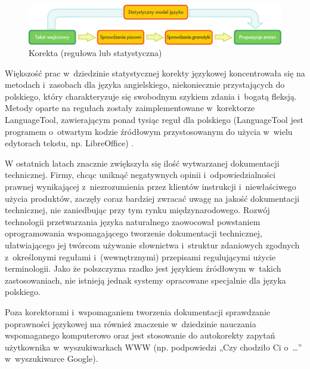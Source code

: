 \begin{multicols}{2}
\begin{figure}[t]  \center
\includegraphics[width=\textwidth]{../_media/polish/language_checking}
\caption{Korekta (regułowa lub statystyczna)} \label{fig:
langcheckingaarch_pl} 
\end{figure} 

Większość prac w~dziedzinie statystycznej korekty językowej
koncentrowała się na metodach i~zasobach dla języka angielskiego,
niekoniecznie przystających do polskiego, który charakteryzuje się
swobodnym szykiem zdania i~bogatą fleksją. Metody oparte na
regułach zostały zaimplementowane w~korektorze LanguageTool,
zawierającym ponad tysiąc reguł dla polskiego (LanguageTool jest
programem o~otwartym kodzie źródłowym przystosowanym do użycia
w~wielu edytorach tekstu, np. LibreOffice) \cite{lto1, Mikowski2010}. 


W ostatnich latach znacznie zwiększyła się ilość wytwarzanej
dokumentacji technicznej. Firmy, chcąc uniknąć negatywnych opinii
i~odpowiedzialności prawnej wynikającej z~niezrozumienia przez
klientów instrukcji i~niewłaściwego użycia produktów, zaczęły
coraz bardziej zwracać uwagę na jakość dokumentacji technicznej,
nie zaniedbując przy tym rynku międzynarodowego. Rozwój technologii
przetwarzania języka naturalnego zaowocował powstaniem
oprogramowania wspomagającego tworzenie dokumentacji technicznej,
ułatwiającego jej twórcom używanie słownictwa i~struktur
zdaniowych zgodnych z~określonymi regułami i~(wewnętrznymi)
przepisami regulującymi użycie terminologii. Jako że polszczyzna
rzadko jest językiem źródłowym w~takich zastosowaniach, nie
istnieją jednak systemy opracowane specjalnie dla języka polskiego. 

Poza korektorami i~wspomaganiem tworzenia dokumentacji sprawdzanie
poprawności językowej ma również znaczenie w~dziedzinie nauczania
wspomaganego komputerowo oraz jest stosowanie do autokorekty zapytań
użytkownika w~wyszukiwarkach WWW (np. podpowiedzi „Czy chodziło Ci
o~\ldots{}” w~wyszukiwarce Google). 


\end{multicols}
